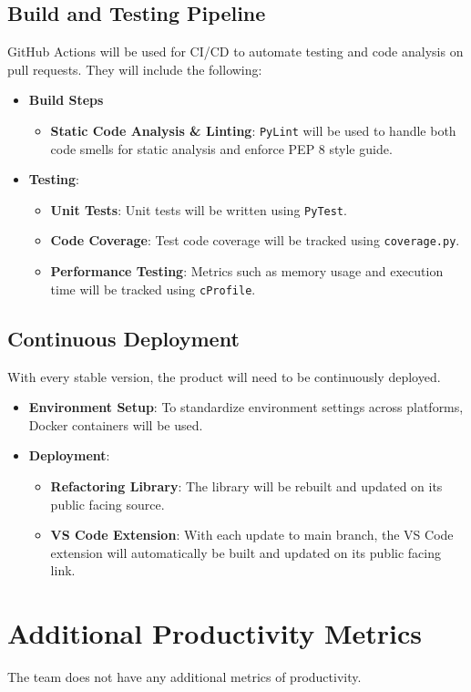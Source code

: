 \documentclass{article}
\begin{document}
\subsection{Build and Testing Pipeline}
GitHub Actions will be used for CI/CD to automate testing and code analysis on pull requests. They will include the following:
\begin{itemize}
    \item \textbf{Build Steps}
    \begin{itemize}
        \item \textbf{Static Code Analysis \& Linting}: \texttt{PyLint} will be used to handle both code smells for static analysis and enforce PEP 8 style guide.
    \end{itemize}
    \item \textbf{Testing}:
    \begin{itemize}
        \item \textbf{Unit Tests}: Unit tests will be written using \texttt{PyTest}.
        \item \textbf{Code Coverage}: Test code coverage will be tracked using \texttt{coverage.py}.
        \item \textbf{Performance Testing}: Metrics such as memory usage and execution time will be tracked using \texttt{cProfile}.
    \end{itemize}
\end{itemize}

\subsection{Continuous Deployment}
With every stable version, the product will need to be continuously deployed.
\begin{itemize}
    \item \textbf{Environment Setup}: To standardize environment settings across platforms, Docker containers will be used.
    \item \textbf{Deployment}:
    \begin{itemize}
        \item \textbf{Refactoring Library}: The library will be rebuilt and updated on its public facing source.
        \item \textbf{VS Code Extension}: With each update to main branch, the VS Code extension will automatically be built and updated on its public facing link.
    \end{itemize}
\end{itemize}

\section{Additional Productivity Metrics}
The team does not have any additional metrics of productivity.
\end{document}
